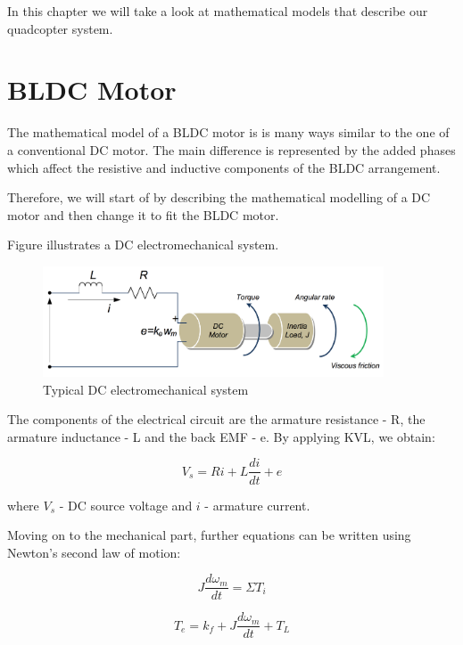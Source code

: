 In this chapter we will take a look at mathematical models that describe our quadcopter system.

\section{BLDC Motor}
The mathematical model of a BLDC motor is is many ways similar to the one of a conventional DC motor. The main difference is represented by the added phases which affect the resistive and inductive components of the BLDC arrangement.

Therefore, we will start of by describing the mathematical modelling of a DC motor and then change it to fit the BLDC motor.

Figure \label{electromech} illustrates a DC electromechanical system.

\begin{figure}[H]
  \centering
    \includegraphics[width=0.9\textwidth]{images/electromech.png}
	\caption{Typical DC electromechanical system}
	\label{electromech}
\end{figure}

The components of the electrical circuit are the armature resistance - R, the armature inductance - L and the back EMF - e. By applying KVL, we obtain:

\begin{equation}
\label{1}
	V_{s}=Ri+L\frac{di}{dt}+e
\end{equation}

where $V_{s}$ - DC source voltage and $i$ - armature current.

Moving on to the mechanical part, further equations can be written using Newton's second law of motion:

\begin{equation}
\label{2}
	J\frac{d\omega_{m}}{dt}=\Sigma{T_{i}}
\end{equation}

\begin{equation}
\label{3}
	T_{e}=k_{f}+J\frac{d\omega_{m}}{dt}+T_{L}
\end{equation}

